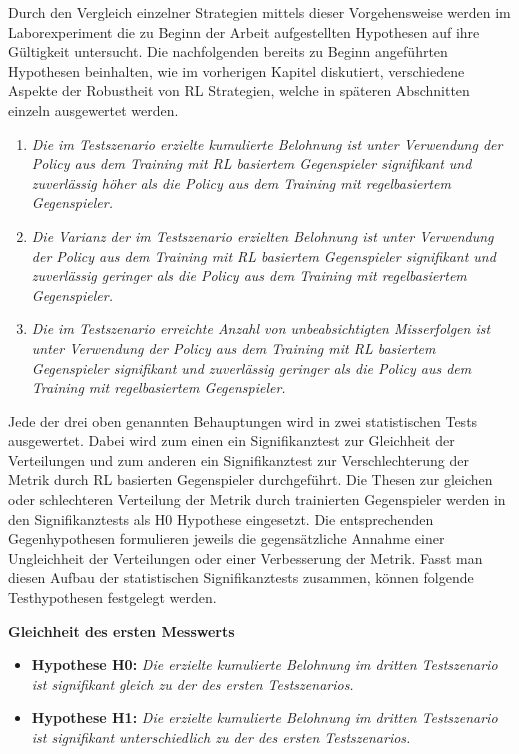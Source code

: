 Durch den Vergleich einzelner Strategien mittels dieser Vorgehensweise werden im Laborexperiment die zu Beginn der Arbeit aufgestellten Hypothesen auf ihre Gültigkeit untersucht.
Die nachfolgenden bereits zu Beginn angeführten Hypothesen beinhalten, wie im vorherigen Kapitel diskutiert, verschiedene Aspekte der Robustheit von RL Strategien, welche in späteren Abschnitten einzeln ausgewertet werden.
\begin{enumerate}
    \item \textit{Die im Testszenario erzielte kumulierte Belohnung ist unter Verwendung der Policy aus dem Training mit RL basiertem Gegenspieler signifikant und zuverlässig höher als die Policy aus dem Training mit regelbasiertem Gegenspieler.}
    \item \textit{Die Varianz der im Testszenario erzielten Belohnung ist unter Verwendung der Policy aus dem Training mit RL basiertem Gegenspieler signifikant und zuverlässig geringer als die Policy aus dem Training mit regelbasiertem Gegenspieler.}
    \item \textit{Die im Testszenario erreichte Anzahl von unbeabsichtigten Misserfolgen ist unter Verwendung der Policy aus dem Training mit RL basiertem Gegenspieler signifikant und zuverlässig geringer als die Policy aus dem Training mit regelbasiertem Gegenspieler.}
\end{enumerate}

Jede der drei oben genannten Behauptungen wird in zwei statistischen Tests ausgewertet.
Dabei wird zum einen ein Signifikanztest zur Gleichheit der Verteilungen und zum anderen ein Signifikanztest zur Verschlechterung der Metrik durch RL basierten Gegenspieler durchgeführt.
Die Thesen zur gleichen oder schlechteren Verteilung der Metrik durch trainierten Gegenspieler werden in den Signifikanztests als H0 Hypothese eingesetzt.
Die entsprechenden Gegenhypothesen formulieren jeweils die gegensätzliche Annahme einer Ungleichheit der Verteilungen oder einer Verbesserung der Metrik. 
Fasst man diesen Aufbau der statistischen Signifikanztests zusammen, können folgende Testhypothesen festgelegt werden. 

\textbf{Gleichheit des ersten Messwerts}
\begin{itemize}
    \item \textbf{Hypothese H0:} \textit{Die erzielte kumulierte Belohnung im dritten Testszenario ist signifikant gleich zu der des ersten Testszenarios.}
    \item \textbf{Hypothese H1:} \textit{Die erzielte kumulierte Belohnung im dritten Testszenario ist signifikant unterschiedlich zu der des ersten Testszenarios.}
\end{itemize}

